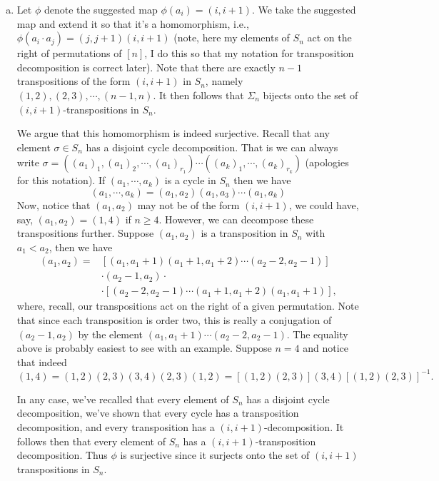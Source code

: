 \documentclass[12pt,letterpaper,boxed]{hmcpset}
\newcommand{\inv}{^{-1}}
\begin{document}
\begin{solution}
\begin{enumerate}[(a)]
\item Let $\phi$ denote the suggested map $\phi(a_i) = (i, i+1)$. We
take the suggested map and extend it so that it's a homomorphism,
i.e., $\phi(a_i \cdot a_j) = (j,j+1)(i,i+1)$ (note, here my elements
of $S_n$ act on the right of permutations of $[n]$, I do this so that
my notation for transposition decomposition is correct later). 
Note that there are exactly $n-1$ transpositions of the form $(i,i+1)$
in $S_n$, namely $(1,2), (2,3), \cdots, (n-1, n)$. It then follows
that $\Sigma_n$ bijects onto the set of $(i,i+1)$-transpositions in
$S_n$. 

We argue that this
homomorphism is indeed surjective.
Recall that any
element $\sigma \in S_n$ has a disjoint cycle decomposition. That is we can
always write $\sigma = ((a_1)_1, (a_1)_2, \cdots, (a_1)_{r_1}) \cdots ((a_k)_1,
\cdots, (a_k)_{r_k})$ (apologies for this notation). 
If $(a_1, \cdots, a_k)$ is a cycle in $S_n$
then we have \[
	(a_1, \cdots, a_k) = (a_1, a_2)(a_1, a_3) \cdots (a_1, a_k)
\]
Now, notice that $(a_1, a_2)$ may not be of the form $(i, i+1)$, we
could have, say, $(a_1, a_2) = (1, 4)$ if $n \geq 4$. However, we can
decompose these transpositions further. Suppose $(a_1, a_2)$ is a transposition in
$S_n$ with $a_1 < a_2$, then we have 
\begin{align*}
(a_1, a_2) = &[(a_1, a_1 + 1) (a_1+1, a_1 + 2) \cdots (a_2 -2, a_2 -1)] \\
	& \cdot (a_2 - 1, a_2) \cdot \\
	& \cdot [(a_2 - 2, a_2 -1) \cdots (a_1 + 1, a_1 + 2) (a_1, a_1+1)], 
\end{align*}
where, recall, our transpositions act on the right of a given
permutation. Note that since each transposition is order two, this is
really a conjugation of $(a_2 - 1, a_2)$ by the element $(a_1, a_1 +
1) \cdots (a_2 - 2, a_2 - 1)$. The equality above is probably easiest to see with an
example. Suppose $n = 4$ and notice that indeed \[
(1, 4) = (1,2) (2,3) (3,4) (2,3) (1,2) = [(1,2)(2,3)](3,4)[(1,2)(2,3)]\inv.
\]

In any case, we've recalled that every element of $S_n$ has a disjoint
cycle decomposition, we've shown that every cycle has a transposition decomposition,
and every transposition has a $(i,i+1)$-decomposition. It follows then
that every element of $S_n$ has a $(i,i+1)$-transposition
decomposition. Thus $\phi$ is surjective since it surjects onto the
set of $(i,i+1)$ transpositions in $S_n$.


\end{enumerate}
\end{solution}
\end{document}
